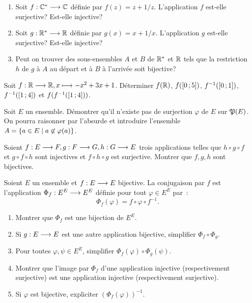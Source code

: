 \begin{exercice}
  \begin{enumerate}
    \item Soit \(f:\mathbb{C}^* \longrightarrow \mathbb{C}\) définie par \(f(z) = z+1/z\). 
      L'application \(f\) est-elle surjective? Est-elle injective?
    \item Soit \(g:\mathbb{R}^* \longrightarrow \mathbb{R}\) définie par \(g(x) = x+1/x\). 
      L'application \(g\) est-elle surjective? Est-elle injective?
    \item Peut on trouver des sous-ensembles \(A\) et \(B\) de \(\mathbb{R}^*\) et 
      \(\mathbb{R}\) tels que la restriction \(h\) de \(g\) à \(A\) au départ et à 
      \(B\) à l'arrivée soit bijective?
  \end{enumerate}
\end{exercice}

\begin{exercice}
  Soit \(f:\mathbb{R} \longrightarrow \mathbb{R}, x \longmapsto -x^2+3x+1\). Déterminer \(f(\mathbb{R})\), 
  \(f(\left[ 0 \, ;  5 \right])\), \(f^{-1}(\left[ 0 \, ;  1 \right])\), 
  \(f^{-1}(\left[ 1 \, ;  4 \right])\) et \(f(f^{-1}(\left[ 1 \, ;  4 \right]))\).
\end{exercice}

\begin{exercice}
  Soit \(E\) un ensemble. Démontrer qu'il n'existe pas de surjection 
  \(\varphi\) de \(E\) sur \(\mathfrak{P}(E)\). On pourra raisonner par l'absurde et 
  introduire l'ensemble \(A = \left\{a \in E\mathrel{}\middle|\mathrel{}a \not\in \varphi(a)\right\}\).
\end{exercice}

\begin{exercice}
  Soient \(f:E \longrightarrow F, g:F \longrightarrow G, h:G \longrightarrow E\) 
  trois applications telles que \(h \circ g \circ f\) et \(g \circ f \circ h\) 
  sont injectives et \(f \circ h \circ g\) est surjective. Montrer que \(f, g, 
  h\) sont bijectives.
\end{exercice}

\begin{exercice}[Conjugaison]
  Soient \(E\) un ensemble et \(f:E \longrightarrow E\) bijective. La 
  conjugaison par \(f\) est l'application \(\Phi_f:E^E \longrightarrow E^E\) 
  définie pour tout \(\varphi \in E^E\) par~:
  \begin{equation}
    \Phi_f(\varphi) = f \circ \varphi \circ f^{-1}.
  \end{equation}
  \begin{enumerate}
    \item Montrer que \(\Phi_f\) est une bijection de \(E^E\).
    \item Si \(g:E \longrightarrow E\) est une autre application bijective, 
      simplifier \(\Phi_f \circ \Phi_g\).
    \item Pour toutes \(\varphi, \psi \in E^E\), simplifier  
      \(\Phi_f(\varphi) \circ \Phi_g(\psi)\).
    \item Montrer que l'image par \(\Phi_f\) d'une application injective 
      (respectivement surjective) est une application injective 
      (respectivement surjective).
    \item Si \(\varphi\) est bijective, expliciter \((\Phi_f(\varphi))^{-1}\).
  \end{enumerate}
\end{exercice}

